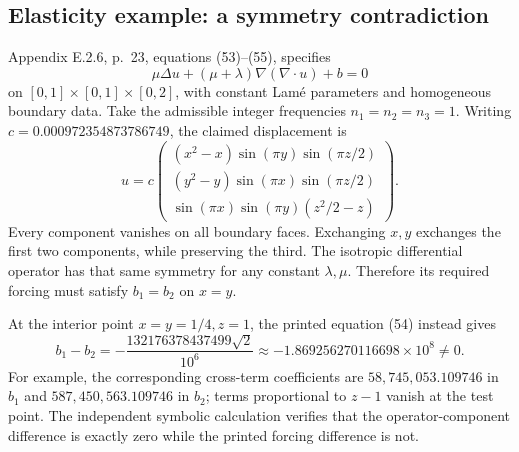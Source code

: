 \documentclass[10pt]{article}
\begin{document}
\subsection*{Elasticity example: a symmetry contradiction}
Appendix E.2.6, p. 23, equations (53)–(55), specifies \[\mu\Delta u+(\mu+\lambda)\nabla(\nabla\!\cdot u)+b=0\] on \([0,1]\times[0,1]\times[0,2]\), with constant Lamé parameters and homogeneous boundary data. Take the admissible integer frequencies \(n_1=n_2=n_3=1\). Writing \(c=0.000972354873786749\), the claimed displacement is \[u=c\begin{pmatrix}
 (x^2-x)\sin(\pi y)\sin(\pi z/2)\\
 (y^2-y)\sin(\pi x)\sin(\pi z/2)\\
 \sin(\pi x)\sin(\pi y)(z^2/2-z)
 \end{pmatrix}.\] Every component vanishes on all boundary faces. Exchanging \(x,y\) exchanges the first two components, while preserving the third. The isotropic differential operator has that same symmetry for any constant \(\lambda,\mu\). Therefore its required forcing must satisfy \(b_1=b_2\) on \(x=y\).\par
At the interior point \(x=y=1/4,z=1\), the printed equation (54) instead gives \[b_1-b_2=-\frac{132176378437499\sqrt2}{10^6}
 \approx-1.869256270116698\times10^8\ne0.\] For example, the corresponding cross-term coefficients are \(58{,}745{,}053.109746\) in \(b_1\) and \(587{,}450{,}563.109746\) in \(b_2\); terms proportional to \(z-1\) vanish at the test point. The independent symbolic calculation verifies that the operator-component difference is exactly zero while the printed forcing difference is not.\par
\end{document}
